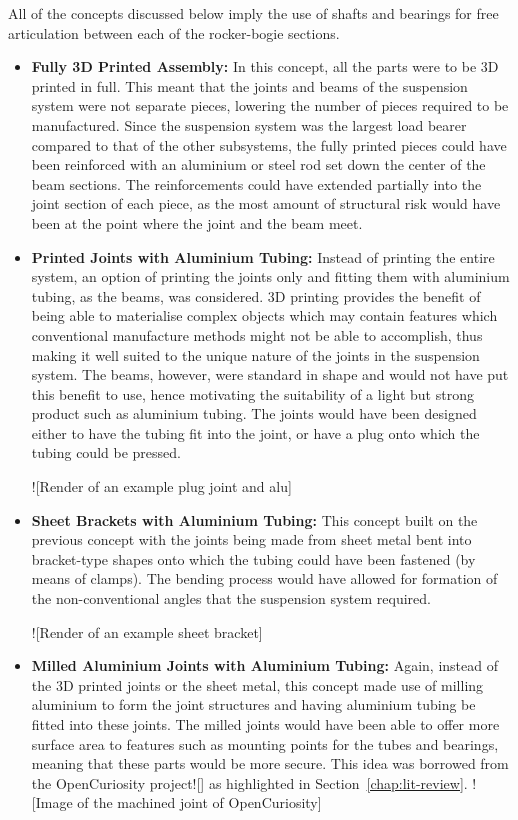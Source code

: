       All of the concepts discussed below imply the use of shafts and bearings for free articulation between each of the rocker-bogie sections.
      
      \begin{itemize}
        \item \textbf{Fully 3D Printed Assembly:} In this concept, all the parts were to be 3D printed in full. This meant that the joints and beams of the suspension system were not separate pieces, lowering the number of pieces required to be manufactured. Since the suspension system was the largest load bearer compared to that of the other subsystems, the fully printed pieces could have been reinforced with an aluminium or steel rod set down the center of the beam sections. The reinforcements could have extended partially into the joint section of each piece, as the most amount of structural risk would have been at the point where the joint and the beam meet.
        
        \item \textbf{Printed Joints with Aluminium Tubing:} Instead of printing the entire system, an option of printing the joints only and fitting them with aluminium tubing, as the beams, was considered. 3D printing provides the benefit of being able to materialise complex objects which may contain features which conventional manufacture methods might not be able to accomplish, thus making it well suited to the unique nature of the joints in the suspension system. The beams, however, were standard in shape and would not have put this benefit to use, hence motivating the suitability of a light but strong product such as aluminium tubing. The joints would have been designed either to have the tubing fit into the joint, or have a plug onto which the tubing could be pressed.
      
        ![Render of an example plug joint and alu]
      
        \item \textbf{Sheet Brackets with Aluminium Tubing:} This concept built on the previous concept with the joints being made from sheet metal bent into bracket-type shapes onto which the tubing could have been fastened (by means of clamps). The bending process would have allowed for formation of the non-conventional angles that the suspension system required.
        
        ![Render of an example sheet bracket]
        
        \item \textbf{Milled Aluminium Joints with Aluminium Tubing:} Again, instead of the 3D printed joints or the sheet metal, this concept made use of milling aluminium to form the joint structures and having aluminium tubing be fitted into these joints. The milled joints would have been able to offer more surface area to features such as mounting points for the tubes and bearings, meaning that these parts would be more secure. This idea was borrowed from the OpenCuriosity project![] as highlighted in Section~\ref{chap:lit-review}.
        ![Image of the machined joint of OpenCuriosity]
      \end{itemize}

